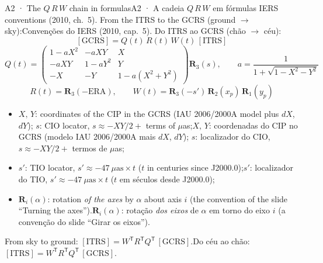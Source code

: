 \documentclass[aspectratio=169,11pt]{beamer}
\newcommand{\tr}[2]{\ifEN#2\else#1\fi}
\begin{document}
\begin{frame}{\tr{A2 · A cadeia $Q\,R\,W$ em fórmulas}{A2 · The $Q\,R\,W$ chain in formulas}}
  \footnotesize
  \tr{Convenções do IERS (2010, cap.~5). Do ITRS ao GCRS (chão $\to$ céu):}{IERS conventions (2010, ch.~5). From the ITRS to the GCRS (ground $\to$ sky):}
  \[ [\text{GCRS}] = Q(t)\,R(t)\,W(t)\,[\text{ITRS}] \]
  \[ Q(t) = \begin{pmatrix} 1-aX^{2} & -aXY & X \\ -aXY & 1-aY^{2} & Y \\ -X & -Y & 1-a(X^{2}+Y^{2}) \end{pmatrix} \mathbf{R}_3(s), \qquad a = \frac{1}{1+\sqrt{1-X^{2}-Y^{2}}} \]
  \[ R(t) = \mathbf{R}_3(-\text{ERA}), \qquad W(t) = \mathbf{R}_3(-s')\,\mathbf{R}_2(x_p)\,\mathbf{R}_1(y_p) \]
  \begin{itemize}
    \setlength{\itemsep}{1pt}
    \item \tr{$X,\,Y$: coordenadas do CIP no GCRS (modelo IAU 2006/2000A mais $dX$, $dY$); $s$: localizador do CIO, $s \approx -XY/2 +$ termos de $\mu$as;}{$X,\,Y$: coordinates of the CIP in the GCRS (IAU 2006/2000A model plus $dX$, $dY$); $s$: CIO locator, $s \approx -XY/2 +$ terms of $\mu$as;}
    \item \tr{$s'$: localizador do TIO, $s' \approx -47\ \mu\text{as} \times t$ ($t$ em séculos desde J2000.0);}{$s'$: TIO locator, $s' \approx -47\ \mu\text{as} \times t$ ($t$ in centuries since J2000.0);}
    \item \tr{$\mathbf{R}_i(\alpha)$: rotação \emph{dos eixos} de $\alpha$ em torno do eixo $i$ (a convenção do slide ``Girar os eixos'').}{$\mathbf{R}_i(\alpha)$: rotation \emph{of the axes} by $\alpha$ about axis $i$ (the convention of the slide ``Turning the axes'').}
  \end{itemize}
  \tr{Do céu ao chão: $[\text{ITRS}] = W^{\mathsf T} R^{\mathsf T} Q^{\mathsf T}\,[\text{GCRS}]$.}{From sky to ground: $[\text{ITRS}] = W^{\mathsf T} R^{\mathsf T} Q^{\mathsf T}\,[\text{GCRS}]$.}
\end{frame}
\end{document}
